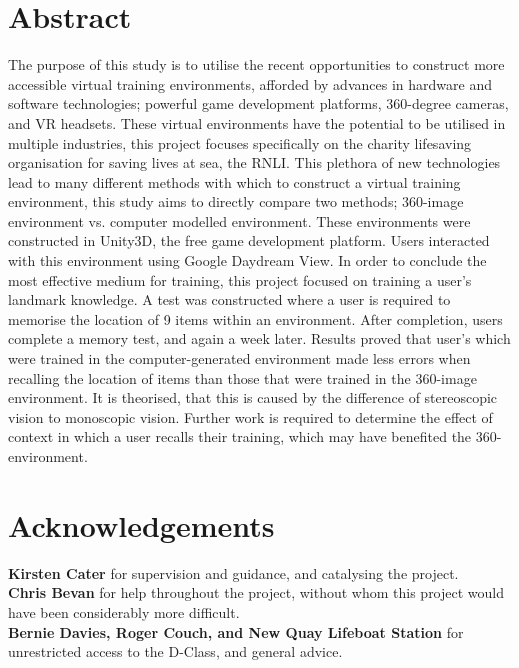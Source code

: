 \documentclass[ %
                    author={Elis Jones},
                supervisor={Dr. Kirsten Cater},
                    degree={BSc},
                     title={The Effect of Presentation Medium on Spatial Cognition},
                  subtitle={in the Virtual Environment},
                      year={2018} ]{dissertation}
\date{}
\begin{document}

\maketitle
\frontmatter
\makedecl



\tableofcontents{}

\chapter*{Abstract}
The purpose of this study is to utilise the recent opportunities to construct more accessible virtual training environments, afforded by advances in hardware and software technologies; powerful game development platforms, 360-degree cameras, and VR headsets. These virtual environments have the potential to be utilised in multiple industries, this project focuses specifically on the charity lifesaving organisation for saving lives at sea, the RNLI. This plethora of new technologies lead to many different methods with which to construct a virtual training environment, this study aims to directly compare two methods; 360-image environment vs. computer modelled environment. These environments were constructed in Unity3D, the free game development platform. Users interacted with this environment using Google Daydream View. In order to conclude the most effective medium for training, this project focused on training a user's landmark knowledge. A test was constructed where a user is required to memorise the location of 9 items within an environment. After completion, users complete a memory test, and again a week later. Results proved that user's which were trained in the computer-generated environment made less errors when recalling the location of items than those that were trained in the 360-image environment. It is theorised, that this is caused by the difference of stereoscopic vision to monoscopic vision. Further work is required to determine the effect of context in which a user recalls their training, which may have benefited the 360-environment.  

\chapter*{Acknowledgements}
\textbf{Kirsten Cater} for supervision and guidance, and catalysing the project. \\
\textbf{Chris Bevan} for help throughout the project, without whom this project would have been considerably more difficult.\\
\textbf{Bernie Davies, Roger Couch, and New Quay Lifeboat Station} for unrestricted access to the D-Class, and general advice. \\
\end{document}
